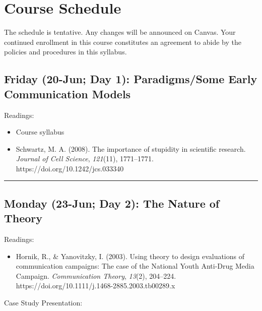 \documentclass[
  letterpaper,
]{article}
\providecommand{\tightlist}{%
  \setlength{\itemsep}{0pt}\setlength{\parskip}{0pt}}\usepackage{longtable,booktabs,array}
\begin{document}
\newpage

\hypertarget{course-schedule}{%
\section{Course Schedule}\label{course-schedule}}

The schedule is tentative. Any changes will be announced on Canvas. Your
continued enrollment in this course constitutes an agreement to abide by
the policies and procedures in this syllabus.

\hypertarget{friday-20-jun-day-1-paradigmssome-early-communication-models}{%
\subsection{Friday (20-Jun; Day 1): Paradigms/Some Early Communication
Models}\label{friday-20-jun-day-1-paradigmssome-early-communication-models}}

Readings:

\begin{itemize}
\tightlist
\item
  Course syllabus
\item
  Schwartz, M. A. (2008). The importance of stupidity in scientific
  research. \emph{Journal of Cell Science}, \emph{121}(11), 1771--1771.
  https://doi.org/10.1242/jcs.033340
\end{itemize}

\begin{center}\rule{0.5\linewidth}{0.5pt}\end{center}

\hypertarget{monday-23-jun-day-2-the-nature-of-theory}{%
\subsection{Monday (23-Jun; Day 2): The Nature of
Theory}\label{monday-23-jun-day-2-the-nature-of-theory}}

Readings:

\begin{itemize}
\tightlist
\item
  Hornik, R., \& Yanovitzky, I. (2003). Using theory to design
  evaluations of communication campaigns: The case of the National Youth
  Anti-Drug Media Campaign. \emph{Communication Theory}, \emph{13}(2),
  204--224. https://doi.org/10.1111/j.1468-2885.2003.tb00289.x
\end{itemize}

Case Study Presentation:
\end{document}
